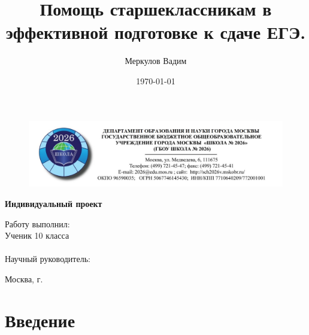 \documentclass[a4paper, 12pt]{extarticle}
\title{Помощь старшеклассникам в эффективной подготовке к сдаче ЕГЭ.}
\author{Меркулов Вадим}
\date{\today}
\begin{document}
\begin{titlepage}
    \vspace*{0.7cm}
    \begin{center}
        \begin{figure}[h]
            \includegraphics{../img/title_page_school_logo.jpg}
        \end{figure}
        \vspace{1.5cm}

        \Large{\textbf{
            Индивидуальный проект \\
            \textquote{\thetitle}}
        }
    \end{center}
    \vspace{5cm}

    \begin{flushright}
        Работу выполнил:\\ \vspace{7pt}
        Ученик 10  класса\\ \vspace{7pt}
        \theauthor\\ \vspace{1cm}
        Научный руководитель:\\ \vspace{7pt}
    \end{flushright}
    \vfill
    \centering
    Москва, {\the\year} г.

\end{titlepage}

\tableofcontents
\newpage

\section{Введение}
\end{document}
